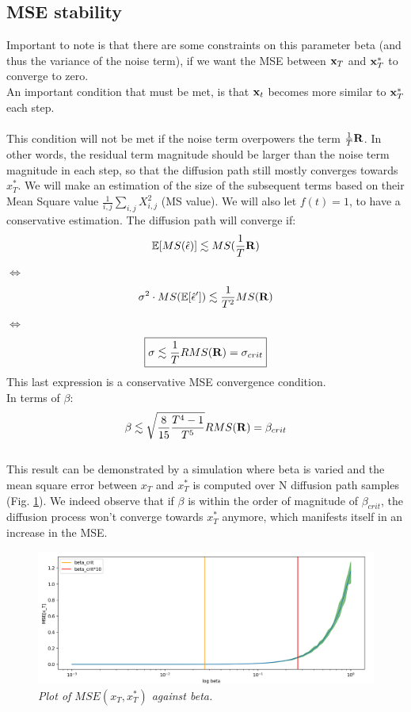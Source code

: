 \documentclass[twocolumn]{article}
\begin{document}
\begin{appendices}
\subsection{MSE stability}
Important to note is that there are some constraints on this parameter beta (and thus the variance of the noise term), if we want the MSE between $\bold{x}_T$ and $\bold{x}_T^*$ to converge to zero.\\
An important condition that must be met, is that $\bold{x}_t$ becomes more similar to $\bold{x}_T^*$ each step.\\
\\
 This condition will not be met if the noise term overpowers the term $\frac{1}{T}  \bold{R}$. In other words, the residual term magnitude should be larger than the noise term magnitude in each step, so that the diffusion path still mostly converges towards $x_T^*$. We will make an estimation of the size of the subsequent terms based on their Mean Square value $\frac{1}{i,j}\sum_{i,j} X_{i,j}^2$ (MS value). We will also let $f(t) = 1$, to have a conservative estimation.
 The diffusion path will converge if:
\begin{equation}
    \mathbb{E}[MS(\hat{\epsilon})] \lesssim MS(\frac{1}{T} \bold{R})
\end{equation}
$\Leftrightarrow$
 \begin{equation}
    \sigma^2 \cdot MS(\mathbb{E}[\hat{\epsilon}']) \lesssim \frac{1}{T^2} MS(\bold{R})
\end{equation}
$\Leftrightarrow$
 \begin{equation}
    \boxed{\sigma \lesssim \frac{1}{T} RMS(\bold{R}) = \sigma_{crit}}
\end{equation}
This last expression is a conservative MSE convergence condition. \\
In terms of $\beta$:
\begin{equation}
    \beta \lesssim \sqrt{\frac{8}{15} \frac{T^4-1}{T^5}} RMS(\bold{R}) = \beta_{crit}
\end{equation}
\\
This result can be demonstrated by a simulation where beta is varied and the mean square error between $x_T$ and $x_T^*$ is computed over N diffusion path samples (Fig. \ref{fig:beta sweep}). We indeed observe that if $\beta$ is within the order of magnitude of $\beta_{crit}$, the diffusion process won't converge towards $x_T^*$ anymore, which manifests itself in an increase in the MSE. 

\begin{figure}[h!]
    \centering
    \includegraphics[width=0.8\linewidth]{beta_sweep.png}
    \caption{\textit{Plot of $MSE(x_T, x_T^*)$ against beta. }}
    \label{fig:beta sweep}
\end{figure}

\FloatBarrier


\end{appendices}
\end{document}
